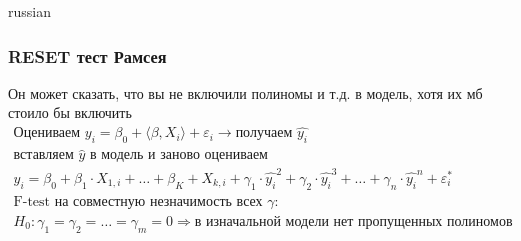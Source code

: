 \documentclass{article}
\begin{document}
\begin{otherlanguage*}{russian}
\subsubsection*{RESET тест Рамсея}
Он может сказать, что вы не включили полиномы и т.д. в модель, хотя их мб стоило бы включить 
\begin{align*}
\text{Оцениваем } y_i = \beta_0 + \langle \beta, X_i \rangle + \varepsilon_i \rightarrow \text{получаем } \hat{y_i} \\
\text{вставляем } \hat{y} \text{ в модель и заново оцениваем } \\
y_i = \beta_0 + \beta_1 \cdot X_{1, i} + \ldots + \beta_K + X_{k, i} + \gamma_1 \cdot \hat{y_i} ^2 + \gamma_2 \cdot \hat{y_i}^3 + \ldots + \gamma_n \cdot \hat{y_i}^n + \varepsilon^*_i \\
\text{F-test на совместную незначимость всех } \gamma: \\
H_0: \gamma_1 = \gamma_2 = \ldots = \gamma_m = 0 \Rightarrow \text{в изначальной модели нет пропущенных полиномов} 
\end{align*}
\end{otherlanguage*} 
\end{document}
